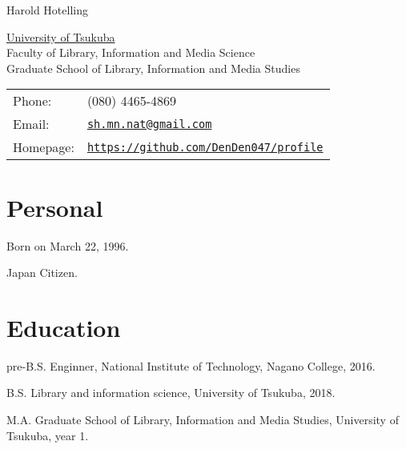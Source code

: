 \documentclass[letterpaper]{article}
\def\name{Harold Hotelling}
\renewenvironment{itemize}{
  \begin{list}{}{
    \setlength{\leftmargin}{1.5em}
  }
}{
  \end{list}
}
\begin{document}
{\huge \name}


\vspace{0.25in}

\begin{minipage}{0.45\linewidth}
  \href{http://www.unc.edu/}{University of Tsukuba} \\
  Faculty of Library, Information and Media Science \\
  Graduate School of Library, Information and Media Studies
\end{minipage}
\begin{minipage}{0.45\linewidth}
  \begin{tabular}{ll}
    Phone: & (080) 4465-4869 \\
    Email: & \href{mailto:sh.mn.nat@gmail.com}{\tt sh.mn.nat@gmail.com} \\
    Homepage: & \href{https://github.com/DenDen047/profile}{\tt https://github.com/DenDen047/profile} \\
  \end{tabular}
\end{minipage}


\section*{Personal}

\begin{itemize}
  \item Born on March 22, 1996.
  \item Japan Citizen.
\end{itemize}


\section*{Education}

\begin{itemize}
  \item pre-B.S. Enginner, National Institute of Technology, Nagano College, 2016.

  \item B.S. Library and information science, University of Tsukuba, 2018.

  \item M.A. Graduate School of Library, Information and Media Studies, University of Tsukuba, year 1.
\end{itemize}
\end{document}
